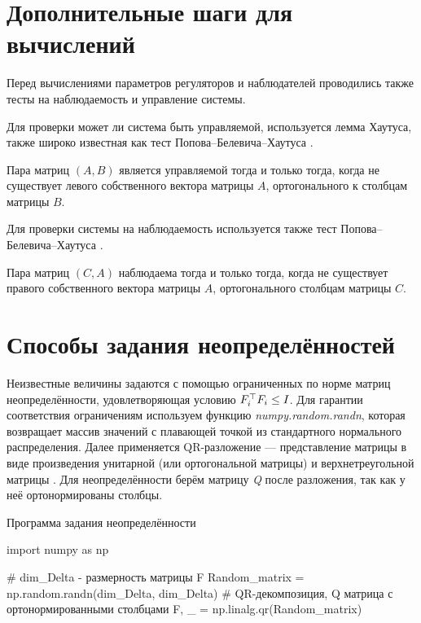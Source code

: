 \chapter{Дополнительные шаги для вычислений}\label{app:B}

Перед вычислениями параметров регуляторов и наблюдателей проводились также тесты на наблюдаемость и управление системы. 

Для проверки может ли система быть управляемой, используется лемма Хаутуса, также широко известная как тест Попова--Белевича--Хаутуса \cite{bernstein2018scalar}.
\begin{lemma}
	Пара матриц $(A, B)$ является управляемой тогда и только тогда, когда не существует левого собственного вектора матрицы $A$, ортогонального к столбцам матрицы $B$.
\end{lemma}

Для проверки системы на наблюдаемость используется также тест Попова--Белевича--Хаутуса \cite{Sontag1998}.

\begin{lemma}
	Пара матриц $(C, A)$ наблюдаема тогда и только тогда, когда не существует правого собственного вектора матрицы $A$, ортогонального столбцам матрицы $C$.
\end{lemma}

\chapter{Способы задания неопределённостей}\label{app:С}
	
Неизвестные величины задаются с помощью ограниченных по норме матриц неопределённости, удовлетворяющая условию ${F}_i^\top{F}_i\leq {I}$. Для гарантии соответствия ограничениям используем функцию \textit{numpy.random.randn}, которая возвращает массив значений с плавающей точкой из стандартного нормального распределения. Далее применяется QR-разложение --- представление матрицы в виде произведения унитарной (или ортогональной матрицы) и верхнетреугольной матрицы \cite{horn1990matrix}. Для неопределённости берём матрицу \textit{Q} после разложения, так как у неё ортонормированы столбцы.

\begin{ListingEnv}[!h]	
\captiondelim{ } %
\caption{Программа задания неопределённости}\label{lst:delta}
	\begin{Verb}
		import numpy as np
		
		# dim_Delta - размерность матрицы F
		Random_matrix = np.random.randn(dim_Delta, dim_Delta)
		# QR-декомпозиция, Q матрица с ортонормированными столбцами
		F, _ = np.linalg.qr(Random_matrix)
	\end{Verb}
\end{ListingEnv}